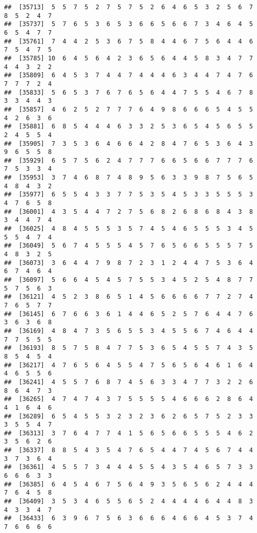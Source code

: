 \documentclass[
]{book}
\begin{document}
\begin{verbatim}
##  [35713]  5  5  7  5  2  7  5  7  5  2  6  4  6  5  3  2  5  6  7  8  5  2  4  7
##  [35737]  5  7  6  5  3  6  5  3  6  6  5  6  6  7  3  4  6  4  5  6  5  4  7  7
##  [35761]  7  4  4  2  5  3  6  7  5  8  4  4  6  7  5  6  4  4  6  7  5  4  7  5
##  [35785] 10  6  4  5  6  4  2  3  6  5  6  4  4  5  8  3  4  7  7  4  4  3  2  2
##  [35809]  6  4  5  3  7  4  4  7  4  4  4  6  3  4  4  7  4  7  6  7  7  7  2  4
##  [35833]  5  6  5  3  7  6  7  6  5  6  4  4  7  5  5  4  6  7  8  3  3  4  4  3
##  [35857]  4  6  2  5  2  7  7  7  6  4  9  8  6  6  6  5  4  5  5  4  2  6  3  6
##  [35881]  6  8  5  4  4  4  6  3  3  2  5  3  6  5  4  5  6  5  5  2  4  5  5  4
##  [35905]  7  3  5  3  6  4  6  6  4  2  8  4  7  6  5  3  6  4  3  9  6  5  5  8
##  [35929]  6  5  7  5  6  2  4  7  7  7  6  6  5  6  6  7  7  7  6  7  5  3  3  4
##  [35953]  3  7  4  6  8  7  4  8  9  5  6  3  3  9  8  7  5  6  5  4  8  4  3  2
##  [35977]  6  5  5  4  3  3  7  7  5  3  5  4  5  3  3  5  5  5  3  4  7  6  5  8
##  [36001]  4  3  5  4  4  7  2  7  5  6  8  2  6  8  6  8  4  3  8  3  4  4  7  4
##  [36025]  4  8  4  5  5  5  3  5  7  4  5  4  6  5  5  5  3  4  5  5  5  4  7  4
##  [36049]  5  6  7  4  5  5  5  4  5  7  6  5  6  6  5  5  5  7  5  4  8  3  2  5
##  [36073]  3  6  4  4  7  9  8  7  2  3  1  2  4  4  7  5  3  6  4  6  7  4  6  4
##  [36097]  5  6  6  4  5  4  5  7  5  5  3  4  5  2  5  4  8  7  7  5  7  5  6  3
##  [36121]  4  5  2  3  8  6  5  1  4  5  6  6  6  6  7  7  2  7  4  7  6  5  7  7
##  [36145]  6  7  6  6  3  6  1  4  4  6  5  2  5  7  6  4  4  7  6  3  6  3  6  8
##  [36169]  4  8  4  7  3  5  6  5  5  3  4  5  5  6  7  4  6  4  4  7  7  5  5  5
##  [36193]  8  5  7  5  8  4  7  7  5  3  6  5  4  5  5  7  4  3  5  8  5  4  5  4
##  [36217]  4  7  6  5  6  4  5  5  4  7  5  6  5  6  4  6  1  6  4  4  6  5  5  6
##  [36241]  4  5  5  7  6  8  7  4  5  6  3  3  4  7  7  3  2  2  6  8  6  4  7  3
##  [36265]  4  7  4  7  4  3  7  5  5  5  5  4  6  6  6  2  8  6  4  4  1  6  4  6
##  [36289]  6  5  4  5  5  3  2  3  2  3  6  2  6  5  7  5  2  3  3  3  5  5  4  7
##  [36313]  3  7  6  4  7  7  4  1  5  6  5  6  6  5  5  5  4  6  2  3  5  6  2  6
##  [36337]  8  8  5  4  3  5  4  7  6  5  4  4  7  4  5  6  7  4  4  3  7  3  6  4
##  [36361]  4  5  5  7  3  4  4  4  5  5  4  3  5  4  6  5  7  3  3  6  6  6  3  3
##  [36385]  6  4  5  4  6  7  5  6  4  9  3  5  6  5  6  2  4  4  4  7  6  4  5  8
##  [36409]  3  5  3  4  6  5  5  6  5  2  4  4  4  4  6  4  4  8  3  4  3  3  4  7
##  [36433]  6  3  9  6  7  5  6  3  6  6  6  4  6  6  4  5  3  7  4  7  6  6  6  6

\end{verbatim}
\end{document}
